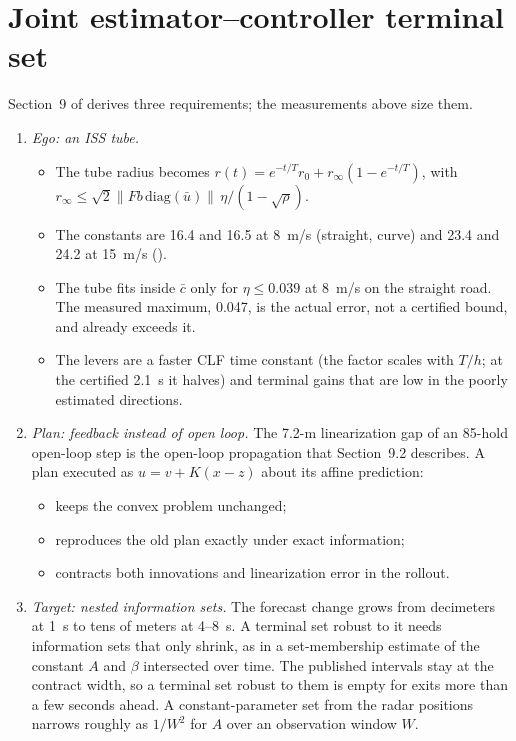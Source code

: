 \documentclass[11pt]{article}
\begin{document}
\section{Joint estimator--controller terminal set}
Section~9 of  derives three
requirements; the measurements above size them.
\begin{enumerate}
\item \emph{Ego: an ISS tube.}
  \begin{itemize}
  \item The tube radius becomes
    $r(t)=e^{-t/T}r_0+r_\infty(1-e^{-t/T})$, with
    $r_\infty\le\sqrt2\|F b\,\mathrm{diag}(\bar u)\|\,\eta/(1-\sqrt\rho)$.
  \item The constants are 16.4 and 16.5 at 8~m/s (straight, curve) and 23.4
    and 24.2 at 15~m/s ().
  \item The tube fits inside $\bar c$ only for $\eta\le0.039$ at 8~m/s on the
    straight road. The measured maximum, 0.047, is the actual error, not a
    certified bound, and already exceeds it.
  \item The levers are a faster CLF time constant (the factor scales with
    $T/h$; at the certified 2.1~s it halves) and terminal gains that are low
    in the poorly estimated directions.
  \end{itemize}
\item \emph{Plan: feedback instead of open loop.} The 7.2-m linearization gap
  of an 85-hold open-loop step is the open-loop propagation that Section~9.2
  describes. A plan executed as $u=v+K(x-z)$ about its affine prediction:
  \begin{itemize}
  \item keeps the convex problem unchanged;
  \item reproduces the old plan exactly under exact information;
  \item contracts both innovations and linearization error in the rollout.
  \end{itemize}
\item \emph{Target: nested information sets.} The forecast change grows
  from decimeters at 1~s to tens of meters at 4--8~s. A terminal set robust
  to it needs information sets that only shrink, as in a set-membership
  estimate of the constant $A$ and $\beta$ intersected over time. The
  published intervals stay at the contract width, so a terminal set robust
  to them is empty for exits more than a few seconds ahead. A
  constant-parameter set from the radar positions narrows roughly as
  $1/W^2$ for $A$ over an observation window $W$.
\end{enumerate}
\end{document}
